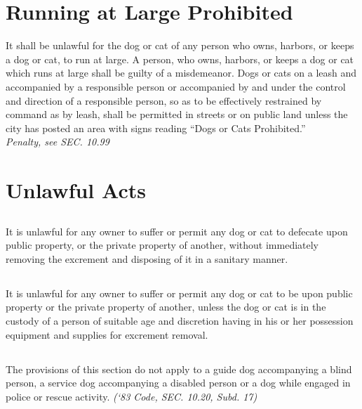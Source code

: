 \section{Running at Large Prohibited}
It shall be unlawful for the dog or cat of any person who owns, harbors, or keeps a dog or cat, to run at large.  A person, who owns, harbors, or keeps a dog or cat which runs at large shall be guilty of a misdemeanor.  Dogs or cats on a leash and accompanied by a responsible person or accompanied by and under the control and direction of a responsible person, so as to be effectively restrained by command as by leash, shall be permitted in streets or on public land unless the city has posted an area with signs reading “Dogs or Cats Prohibited.”\\
\emph{Penalty, see SEC. 10.99}

\section{Unlawful Acts}
\subsection{}
It is unlawful for any owner to suffer or permit any dog or cat to defecate upon public property, or the private property of another, without immediately removing the excrement and disposing of it in a sanitary manner.
\subsection{}
It is unlawful for any owner to suffer or permit any dog or cat to be upon public property or the private property of another, unless the dog or cat is in the custody of a person of suitable age and discretion having in his or her possession equipment and supplies for excrement removal.
\subsection{}
The provisions of this section do not apply to a guide dog accompanying a blind person, a service dog accompanying a disabled person or a dog while engaged in police or rescue activity. \emph{(‘83 Code, SEC. 10.20, Subd. 17)}
